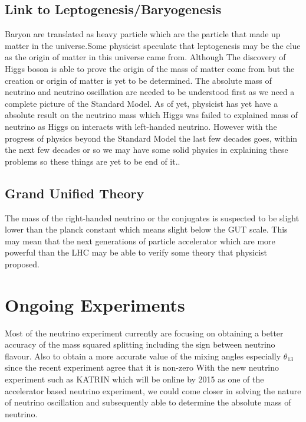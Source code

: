 \documentclass[11pt ,a4paper]{article}
\begin{document}
\subsection*{Link to Leptogenesis/Baryogenesis}
Baryon are translated as heavy particle which are the particle that made up matter in the universe.\cite{}Some physicist speculate that leptogenesis may be the clue as the origin of matter in this universe came from. Although The discovery of Higgs boson is able to prove the origin of the mass of matter\cite{OriMatter} come from but the creation or origin of matter is yet to be determined. The absolute mass of neutrino and neutrino oscillation are needed to be understood first as we need a complete picture of the Standard Model. As of yet, physicist has yet have a absolute result on the neutrino mass which Higgs was failed to explained mass of neutrino as Higgs on interacts with left-handed neutrino. However with the progress of physics beyond the Standard Model the last few decades goes, within the next few decades or so we may have some solid physics in explaining these problems so these things are yet to be end of it..
\cite{dibari}
\subsection*{Grand Unified Theory}
The mass of the right-handed neutrino or the conjugates is suspected to be slight lower than the planck constant which means slight below the GUT scale. \cite{} This may mean that the next generations of particle accelerator which are more powerful than the LHC may be able to verify some theory that physicist proposed.\cite{king07}
\section*{Ongoing Experiments}
Most of the neutrino experiment currently are focusing on obtaining a better accuracy of the mass squared splitting including the sign between neutrino flavour. Also to obtain a more accurate value of the mixing angles especially \(\theta_{13} \) since the recent experiment agree that it is non-zero\cite{theta130} With the new neutrino experiment such as KATRIN which will be online by 2015 as one of the accelerator based neutrino experiment\cite{katrin}, we could come closer in solving the nature of neutrino oscillation and subsequently able to determine the absolute mass of neutrino.
\end{document}
